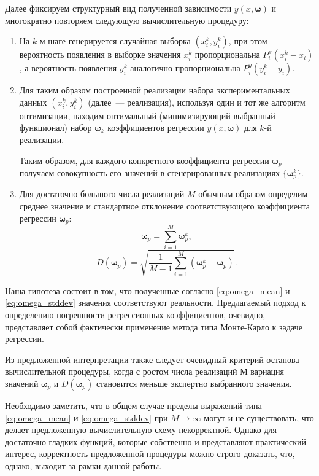 \documentclass[11pt,a4paper]{article}
\theoremstyle{definition}
\begin{document}
Далее фиксируем структурный вид полученной зависимости $y(x, \boldsymbol{\omega})$ и
многократно повторяем следующую вычислительную процедуру:
\begin{enumerate}
  \item На $k$-м шаге генерируется случайная выборка $(x_i^k, y_i^k)$, при этом
	вероятность появления в выборке значения $x_i^k$ пропорциональна
	$P_i^x (x_i^k - x_i)$, а вероятность появления $y_i^k$ аналогично
	пропорциональна $P_i^y (y_i^k - y_i)$.
  \item Для таким образом построенной реализации набора экспериментальных
    данных $(x_i^k, y_i^k)$ (далее~--- реализация), используя один и тот же
    алгоритм оптимизации, находим оптимальный (минимизирующий выбранный
	функционал) набор $\boldsymbol{\omega}_k$ коэффициентов регрессии
	$y(x, \boldsymbol{\omega})$ для $k$-й реализации.

	Таким образом, для каждого конкретного коэффициента регрессии
	$\boldsymbol{\omega}_p$ получаем совокупность его значений в сгенерированных реализациях
	$\{ \boldsymbol{\omega}_p^k \}$.
  \item Для достаточно большого числа реализаций $M$ обычным образом определим
	  среднее значение и стандартное отклонение соответствующего
	  коэффициента регрессии $\boldsymbol{\omega}_p$:
	  \begin{equation}
		\label{eq:omega_mean}
		\overline{\boldsymbol{\omega}_p} = \sum_{i = 1}^M \boldsymbol{\omega}_p^k,
	  \end{equation}
	  \begin{equation}
		\label{eq:omega_stddev}
		D(\boldsymbol{\omega}_p) = \sqrt{\frac{1}{M - 1} \sum_{i = 1}^M (\boldsymbol{\omega}_p^k - \overline{\boldsymbol{\omega}_p})}.
	  \end{equation}
\end{enumerate}

Наша гипотеза состоит в том, что полученные согласно \eqref{eq:omega_mean} и \eqref{eq:omega_stddev}
значения соответствуют реальности. Предлагаемый подход к определению
погрешности регрессионных коэффициентов, очевидно, представляет собой
фактически применение метода типа Монте-Карло к задаче регрессии.

Из предложенной интерпретации также следует очевидный критерий
останова вычислительной процедуры, когда с ростом числа реализаций $М$
вариация значений $\overline{\boldsymbol{\omega}_p}$ и
$D(\boldsymbol{\omega}_p)$ становится меньше экспертно выбранного
значения.

Необходимо заметить, что в общем случае пределы выражений типа
\eqref{eq:omega_mean} и \eqref{eq:omega_stddev}
при $M \rightarrow \infty$ могут и не существовать, что делает предложенную
вычислительную схему некорректной. Однако для достаточно гладких
функций, которые собственно и представляют практический интерес,
корректность предложенной процедуры можно строго доказать, что, однако,
выходит за рамки данной работы.
\end{document}
